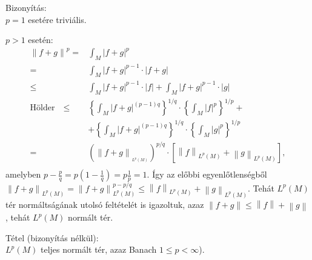 \documentclass[12pt,a4paper]{scrartcl}
\newenvironment{tetel}{}{}
\newenvironment{bizonyitas}{}{}
\begin{document}
\begin{bizonyitas}

Bizonyítás:\\
\(p = 1\) esetére triviális.

\(p > 1\) esetén: \[\begin{aligned}
  {\left\| {f + g} \right\|^p} =  & \int_M {{{\left| {f + g} \right|}^p}}  \\ 
   =  & \int_M {{{\left| {f + g} \right|}^{p - 1}}}  \cdot \left| {f + g} \right| \\ 
   \leqslant  & \int_M {{{\left| {f + g} \right|}^{p - 1}}}  \cdot \left| f \right| + \int_M {{{\left| {f + g} \right|}^{p - 1}}}  \cdot \left| g \right| \\ 
  {\text{Hölder}}\quad  \leqslant  & {\left\{ {\int_M {{{\left| {f + g} \right|}^{\left( {p - 1} \right)q}}} } \right\}^{1/q}} \cdot {\left\{ {\int_M {{{\left| f \right|}^p}} } \right\}^{1/p}} +  \\ 
   &  + {\left\{ {\int_M {{{\left| {f + g} \right|}^{\left( {p - 1} \right)q}}} } \right\}^{1/q}} \cdot {\left\{ {\int_M {{{\left| g \right|}^p}} } \right\}^{1/p}} \\ 
   =  & {\left( {{{\left\| {f + g} \right\|}_{_{{L^p}\left( M \right)}}}} \right)^{p/q}} \cdot \left[ {{{\left\| f \right\|}_{{L^p}\left( M \right)}} + {{\left\| g \right\|}_{{L^p}\left( M \right)}}} \right], \\ 
\end{aligned} \] amelyben
\(p - \frac{p}{q} = p\left( {1 - \frac{1}{q}} \right) = p\frac{1}{p} = 1\).
Így az előbbi egyenlőtlenségből
\(\left\| {f + g} \right\|_{L^{p}{(M)}} = \left\| {f + g} \right\|_{L^{p}{(M)}}^{p - p/q} \leq \left\| f \right\|_{L^{p}{(M)}} + \left\| g \right\|_{L^{p}{(M)}}\).
Tehát \(L^{p}\left( M \right)\) tér normáltságának utolsó feltételét is
igazoltuk, azaz
\(\left\| {f + g} \right\| \leq \left\| f \right\| + \left\| g \right\|\),
tehát \(L^{p}\left( M \right)\) normált tér.

\end{bizonyitas}

\begin{tetel}

Tétel (bizonyítás nélkül):\\
\(L^{p}\left( M \right)\) teljes normált tér, azaz Banach
\(1 \leq p < \infty\)).

\end{tetel}
\end{document}

